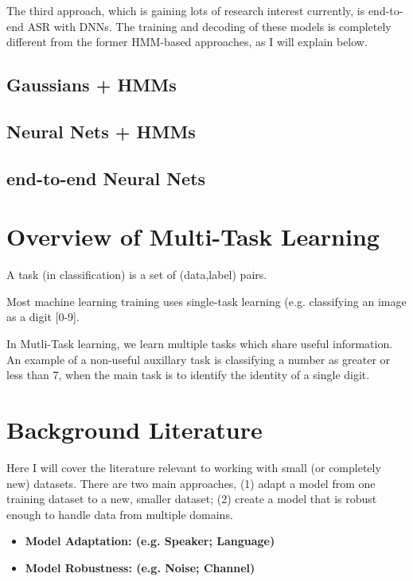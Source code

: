 \documentclass[10pt,a4paper]{article}
\begin{document}
The third approach, which is gaining lots of research interest currently, is end-to-end ASR with DNNs. The training and decoding of these models is completely different from the former HMM-based approaches, as I will explain below.


\subsection{Gaussians + HMMs}
  
\subsection{Neural Nets + HMMs}
  
\subsection{end-to-end Neural Nets}


\section{Overview of Multi-Task Learning}

A task (in classification) is a set of (data,label) pairs.

Most machine learning training uses single-task learning (e.g. classifying an image as a digit [0-9].

In Mutli-Task learning, we learn multiple tasks which share useful information. An example of a non-useful auxillary task is classifying a number as greater or less than 7, when the main task is to identify the identity of a single digit.



\section{Background Literature}

Here I will cover the literature relevant to working with small (or completely new) datasets. There are two main approaches, (1) adapt a model from one training dataset to a new, smaller dataset; (2) create a model that is robust enough to handle data from multiple domains. 

\begin{itemize}

\item \textbf{Model Adaptation: (e.g. Speaker; Language)}

    
  
\item \textbf{Model Robustness: (e.g. Noise; Channel)}

  
\end{itemize}
\end{document}
